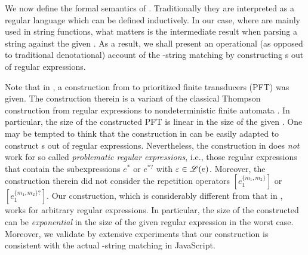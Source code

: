 We now define the formal semantics of {\regexp}. Traditionally they are interpreted as a regular language which can be defined inductively. 
In our case, where {\regexp} are mainly used in string functions, %
what matters is %
the intermediate result when parsing a string against the given {\regexp}. %
As a result, we shall present an operational (as opposed to traditional denotational) account of the \regexp-string matching by constructing {\PSST}s out of regular expressions. 


Note that in \cite{BDM14,BM17}, a construction from {\regexp} to prioritized finite transducers (PFT) was given. The construction therein is a variant of the classical Thompson construction from regular expressions to nondeterministic finite automata \cite{Thompson68}. In particular, the size of the constructed PFT is linear in the size of the given {\regexp}. One may be tempted to think that the construction in \cite{BDM14,BM17} can be easily adapted to construct {\PSST}s out of regular expressions. 
%
Nevertheless, the construction in \cite{BDM14,BM17} does \emph{not} work for so called \emph{problematic regular expressions}, i.e.,  those regular expressions that contain the subexpressions $e^*$ or $e^{*?}$ with $\varepsilon \in \mathscr{L}(e)$. Moreover, the construction therein did not consider the repetition operators $[e_1^{\{m_1,m_2\}}]$ or $[e_1^{\{m_1,m_2\}?}]$. 
%
Our construction, which is considerably different from that in \cite{BDM14,BM17}, works for arbitrary regular expressions. In particular, the size of the constructed {\PSST} can be \emph{exponential} in the size of the given regular expression in the worst case. Moreover, we validate by extensive experiments that our construction is consistent with the actual \regexp-string matching in JavaScript. %

